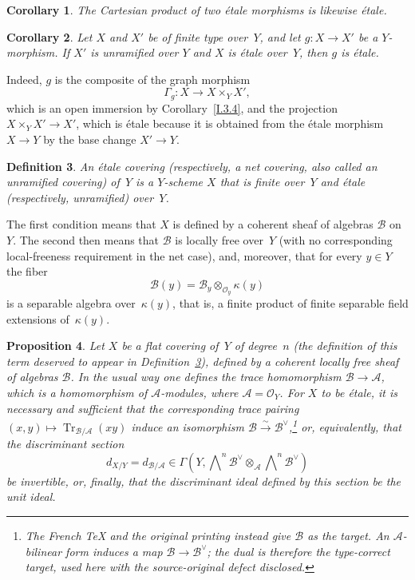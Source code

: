 \documentclass[11pt,oneside]{amsbook}
\newtheorem{proposition}{Proposition}[section]
\newtheorem{corollary}[proposition]{Corollary}
\newtheorem{definition}[proposition]{Definition}
\begin{document}
\begin{corollary}
\label{I.4.7}
The Cartesian product of two étale morphisms is likewise étale.
\end{corollary}

\begin{corollary}
\label{I.4.8}
Let \(X\) and \(X'\) be of finite type over~\(Y\), and let
\(g\colon X\to X'\) be a \(Y\)-morphism.  If \(X'\) is unramified over
\(Y\) and \(X\) is étale over~\(Y\), then \(g\) is étale.
\end{corollary}

Indeed, \(g\) is the composite of the graph morphism
\[
  \Gamma_g\colon X\longrightarrow X\times_Y X',
\]
which is an open immersion by Corollary~\ref{I.3.4}, and the projection
\(X\times_Y X'\to X'\), which is étale because it is obtained from the
étale morphism \(X\to Y\) by the base change \(X'\to Y\).

\begin{definition}
\label{I.4.9}
An \emph{étale covering} (respectively, a \emph{net covering}, also called
an unramified covering) of~\(Y\) is a \(Y\)-scheme \(X\) that is finite
over~\(Y\) and étale (respectively, unramified) over~\(Y\).
\end{definition}

The first condition means that \(X\) is defined by a coherent sheaf of
algebras \(\mathcal B\) on~\(Y\).  The second then means that \(\mathcal B\)
is locally free over~\(Y\) (with no corresponding local-freeness requirement
in the net case), and, moreover, that for every \(y\in Y\) the fiber
\[
  \mathcal B(y)=\mathcal B_y\otimes_{\mathcal O_y}\kappa(y)
\]
is a separable algebra over~\(\kappa(y)\), that is, a finite product of
finite separable field extensions of~\(\kappa(y)\).

\begin{proposition}
\label{I.4.10}
Let \(X\) be a flat covering of~\(Y\) of degree~\(n\) (the definition of
this term deserved to appear in Definition~\ref{I.4.9}), defined by a
coherent locally free sheaf of algebras \(\mathcal B\).  In the usual way one
defines the trace homomorphism \(\mathcal B\to\mathcal A\), which is a
homomorphism of \(\mathcal A\)-modules, where
\(\mathcal A=\mathcal O_Y\).  For \(X\) to be étale, it is necessary and
sufficient that the corresponding trace pairing
\((x,y)\longmapsto\operatorname{Tr}_{\mathcal B/\mathcal A}(xy)\) induce an
isomorphism \(\mathcal B\xrightarrow{\sim}\mathcal B^\vee\),\footnote{The French TeX and the
original printing instead give \(\mathcal B\) as the target.  An
\(\mathcal A\)-bilinear form induces a map
\(\mathcal B\to\mathcal B^\vee\); the dual is therefore the type-correct
target, used here with the source-original defect disclosed.} or,
equivalently,
that the \emph{discriminant section}
\[
  d_{X/Y}=d_{\mathcal B/\mathcal A}
  \in
  \Gamma\!\left(
    Y,
    \bigwedge\nolimits^n\mathcal B^\vee
    \otimes_{\mathcal A}
    \bigwedge\nolimits^n\mathcal B^\vee
  \right)
\]
be invertible, or, finally, that the discriminant ideal defined by this
section be the unit ideal.
\end{proposition}
\end{document}

